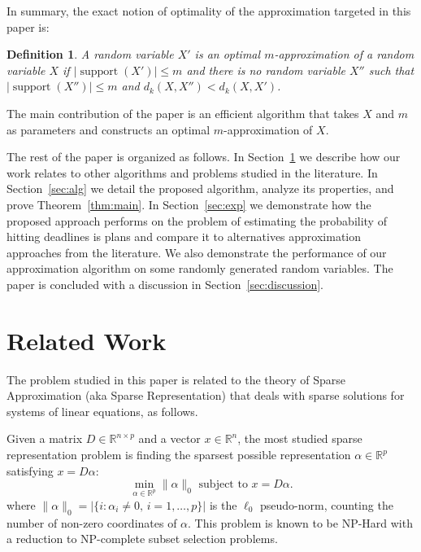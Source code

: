 \documentclass{article}
\newtheorem{definition}[thm]{Definition}
\newtheorem{theorem}[thm]{Theorem}
\DeclareMathOperator{\support}{support}
\begin{document}
In summary, the exact notion of optimality of the approximation targeted in this paper is:
\begin{definition}
	A random variable $X'$ is an optimal $m$-approximation of a random variable $X$ if $|\support(X')| \leq m$ and there is no random variable $X''$ such that $|\support(X'')| \leq m$ and $d_k(X,X'') < d_k(X,X')$.
\end{definition}

The main contribution of the paper is an efficient algorithm that takes $X$ and $m$ as parameters and constructs an optimal $m$-approximation of $X$.


The rest of the paper is organized as follows. In Section~\ref{sec:rel-work} we describe how our work relates to other algorithms and problems studied in the literature. In Section~\ref{sec:alg} we detail the proposed algorithm, analyze its properties, and prove Theorem~\ref{thm:main}. In Section~\ref{sec:exp} we demonstrate how the proposed approach performs on the problem of estimating the probability of hitting deadlines is plans and compare it to alternatives approximation approaches from the literature. We also demonstrate the performance of our approximation algorithm on some randomly generated random variables. The paper is concluded with a discussion in Section~\ref{sec:discussion}.

\section{Related Work}
\label{sec:rel-work}
The problem studied in this paper is related to the theory of Sparse Approximation (aka Sparse Representation) that deals with sparse solutions for systems of linear equations, as follows. 

Given a matrix $D \in \mathbb{R}^{n \times p}$ and a vector $x \in \mathbb{R}^n$, the most studied sparse representation problem is finding the sparsest possible representation $\alpha \in \mathbb{R}^p$ satisfying $x = D\alpha$:
$$
\min_{\alpha \in \mathbb{R}^p} \|\alpha\|_0 \text{ subject to } x = D\alpha.
$$
where $\|\alpha\|_0 = |\{ i : \alpha_i \neq 0, \, i=1,\ldots,p \}|$ is the $\ell_0$ pseudo-norm, counting the number of non-zero coordinates of $\alpha$. This problem is known to be NP-Hard with a reduction to NP-complete subset selection problems.
\end{document}
